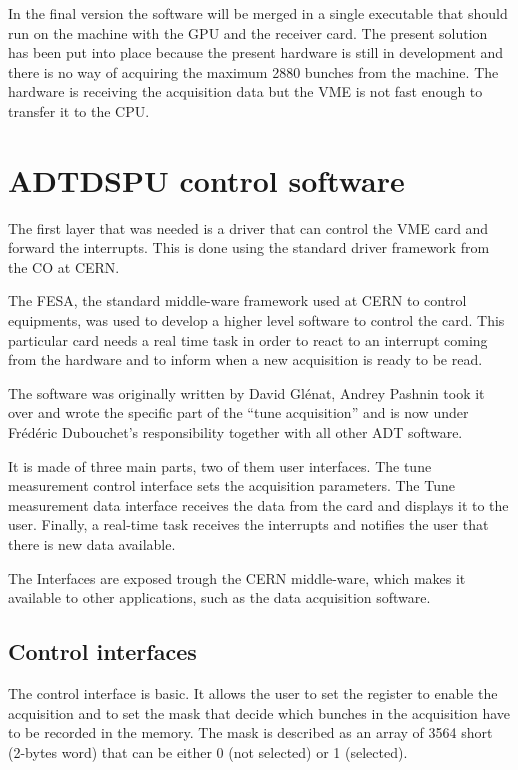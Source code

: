 In the final version the software will be merged in a single executable that should run on the machine with the \gls{GPU} and the receiver card. The present solution has been put into place because the present hardware is still in development and there is no way of acquiring the maximum 2880 bunches from the machine. The hardware is receiving the acquisition data but the \gls{VME} is not fast enough to transfer it to the \gls{CPU}.

\section{ADTDSPU control software}

The first layer that was needed is a driver that can control the \gls{VME} card and forward the interrupts. This is done using the standard driver framework from the \gls{CO} at \gls{CERN}.

The \gls{FESA}, the standard middle-ware framework used at \gls{CERN} to control equipments, was used to develop a higher level software to control the card. This particular card needs a real time task in order to react to an interrupt coming from the hardware and to inform when a new acquisition is ready to be read.

The software was originally written by David Gl{\'e}nat, Andrey
Pashnin took it over and wrote the specific part of the ``tune
acquisition'' and is now under Fr{\'e}d{\'e}ric Dubouchet's
responsibility together with all other \gls{ADT} software.

It is made of three main parts, two of them user interfaces. The tune
measurement control interface sets the acquisition parameters. The
Tune measurement data interface receives the data from the card and displays it
to the user. Finally, a real-time task receives the interrupts and
notifies the user that there is new data available.

The Interfaces are exposed trough the \gls{CERN} middle-ware, which
makes it available to other applications, such as the data acquisition
software.

\subsection{Control interfaces}

The control interface is basic. It allows the user to set the register to
enable the acquisition and to set the mask that decide which bunches
in the acquisition have to be recorded in the memory. The mask is
described as an array of 3564 short (2-bytes word) that can be either
0 (not selected) or 1 (selected).

